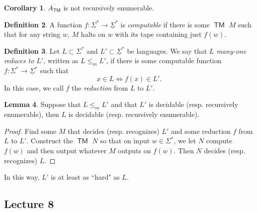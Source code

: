 \documentclass[10pt,letterpaper,cm]{nupset}
\theoremstyle{definition}
\newtheorem{definition}{Definition}[subsection]
\theoremstyle{theorem}
\newtheorem{lemma}[definition]{Lemma}
\newtheorem{corollary}[definition]{Corollary}
\theoremstyle{remark}
\newcommand{\1}{\mathbf{1}}
\newcommand{\0}{\vec 0}
\DeclareMathOperator{\TM}{\mathsf{TM}}
\begin{document}
\begin{corollary}
$\overline{A_{\TM}}$ is not recursively enumerable. 
\end{corollary}

\begin{definition}\label{computable}
A function $f: \Sigma^{\ast} \to \underline{\Sigma}^{\ast}$ is \textit{computable} if there is some $\TM$ $M$ such that for any string $w$, $M$ halts on $w$ with its tape containing just $f(w)$. 
\end{definition}

\begin{definition}
Let $L\subset \Sigma^{\ast}$ and $L' \subset \underline{\Sigma}^{\ast}$ be languages. We say that \textit{$L$ many-one reduces to $L'$}, written as $L \leq_m L'$, if there is some computable function $f: \Sigma^{\ast} \to \underline{\Sigma}^{\ast}$ such that $$x\in L \iff f(x) \in L'.$$ In this case, we call $f$ the \textit{reduction} from $L$ to $L'$.
\end{definition}

\begin{lemma}
Suppose that $L \leq_m L'$ and that $L'$ is decidable (resp. recursively enumerable), then $L$ is decidable (resp. recursively enumerable).
\end{lemma}
\begin{proof}
Find some $M$ that decides (resp. recognizes) $L'$ and some reduction $f$ from $L$ to $L'$. Construct the $\TM$ $N$ so that on input $w\in \Sigma^{\ast}$, we let $N$ compute $f(w)$ and then output whatever $M$ outputs on $f(w)$. Then $N$ decides (resp. recognizes) $L$. 
\end{proof}

In this way, $L'$ is at least as ``hard" as $L$.

\subsection{Lecture 8}
\end{document}

